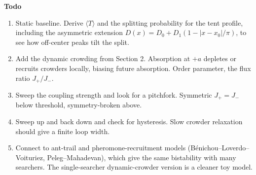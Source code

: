 \documentclass[11pt]{article}
\begin{document}
\textbf{Todo}
\begin{enumerate}
  \item Static baseline. Derive $\langle T \rangle$ and the splitting probability for the tent profile, including the asymmetric extension $D(x) = D_0 + D_1(1 - |x-x_0|/\pi)$, to see how off-center peaks tilt the split.
  \item Add the dynamic crowding from Section 2. Absorption at $+a$ depletes or recruits crowders locally, biasing future absorption. Order parameter, the flux ratio $J_+/J_-$.
  \item Sweep the coupling strength and look for a pitchfork. Symmetric $J_+ = J_-$ below threshold, symmetry-broken above.
  \item Sweep up and back down and check for hysteresis. Slow crowder relaxation should give a finite loop width.
  \item Connect to ant-trail and pheromone-recruitment models (B\'enichou--Loverdo--Voituriez, Peleg--Mahadevan), which give the same bistability with many searchers. The single-searcher dynamic-crowder version is a cleaner toy model.
\end{enumerate}
\end{document}
